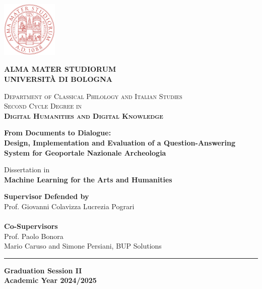 \documentclass[a4paper,12pt, openany]{book}  %
\begin{document}
\begin{titlepage}
    \centering
    \includegraphics[width=0.2\textwidth]{images/unibo-logo.pdf}
    
    \vspace*{1cm}
    \Large
    \textbf{ALMA MATER STUDIORUM \\ 
    UNIVERSITÀ DI BOLOGNA}
    
    
    \vspace{1.5cm}
    
    \normalsize
    \textsc{Department of Classical Philology and Italian Studies} \\
    \vspace{0.5cm}
    \textsc{Second Cycle Degree in} \\
    \vspace{0.2cm}
    \textsc{\textbf{Digital Humanities and Digital Knowledge}}
    
    \vspace{1.6cm}
    
    \begin{spacing}{1}
    \LARGE
    \textbf{From Documents to Dialogue:\\Design, Implementation and Evaluation of a Question-Answering System for Geoportale Nazionale Archeologia}
    \end{spacing}
    
    \vspace{1.2cm}
    \normalsize
    Dissertation in\\
    \textbf{Machine Learning for the Arts and Humanities}
    
    \vspace{1cm}
    
    \begin{tabbing}
    \textbf{Supervisor} \hspace{10cm} \= \textbf{Defended by} \\
    Prof. Giovanni Colavizza \> Lucrezia Pograri \\
    \\
    \textbf{Co-Supervisors}\\
    Prof. Paolo Bonora \\
    Mario Caruso and Simone Persiani, BUP Solutions
    \end{tabbing}
    
    \vfill
    \rule{\linewidth}{0.4pt}
    \vspace{0.2cm}
    
    \textbf{Graduation Session II} \\
    \textbf{Academic Year 2024/2025}
    
\end{titlepage}
\newpage
\thispagestyle{empty}  %
\mbox{}                %
\setcounter{figure}{0}
\end{document}
